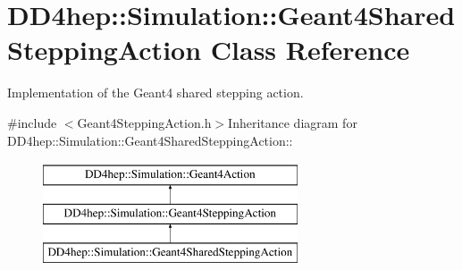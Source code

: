 \hypertarget{class_d_d4hep_1_1_simulation_1_1_geant4_shared_stepping_action}{
\section{DD4hep::Simulation::Geant4SharedSteppingAction Class Reference}
\label{class_d_d4hep_1_1_simulation_1_1_geant4_shared_stepping_action}
}


Implementation of the Geant4 shared stepping action.  


{\ttfamily \#include $<$Geant4SteppingAction.h$>$}Inheritance diagram for DD4hep::Simulation::Geant4SharedSteppingAction::\begin{figure}[H]
\begin{center}
\leavevmode
\includegraphics[height=3cm]{class_d_d4hep_1_1_simulation_1_1_geant4_shared_stepping_action}
\end{center}
\end{figure}
